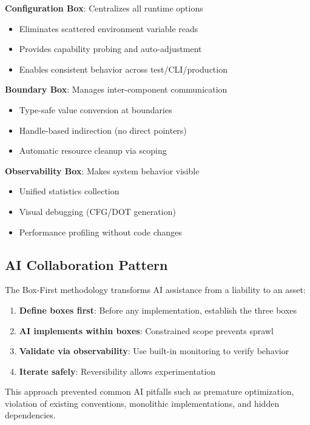 \documentclass[10pt,conference]{IEEEtran}
\begin{document}
\textbf{Configuration Box}: Centralizes all runtime options
\begin{itemize}
\item Eliminates scattered environment variable reads
\item Provides capability probing and auto-adjustment
\item Enables consistent behavior across test/CLI/production
\end{itemize}

\textbf{Boundary Box}: Manages inter-component communication
\begin{itemize}
\item Type-safe value conversion at boundaries
\item Handle-based indirection (no direct pointers)
\item Automatic resource cleanup via scoping
\end{itemize}

\textbf{Observability Box}: Makes system behavior visible
\begin{itemize}
\item Unified statistics collection
\item Visual debugging (CFG/DOT generation)
\item Performance profiling without code changes
\end{itemize}

\subsection{AI Collaboration Pattern}

The Box-First methodology transforms AI assistance from a liability to an asset:

\begin{enumerate}
\item \textbf{Define boxes first}: Before any implementation, establish the three boxes
\item \textbf{AI implements within boxes}: Constrained scope prevents sprawl
\item \textbf{Validate via observability}: Use built-in monitoring to verify behavior
\item \textbf{Iterate safely}: Reversibility allows experimentation
\end{enumerate}

This approach prevented common AI pitfalls such as premature optimization, violation of existing conventions, monolithic implementations, and hidden dependencies.
\end{document}
